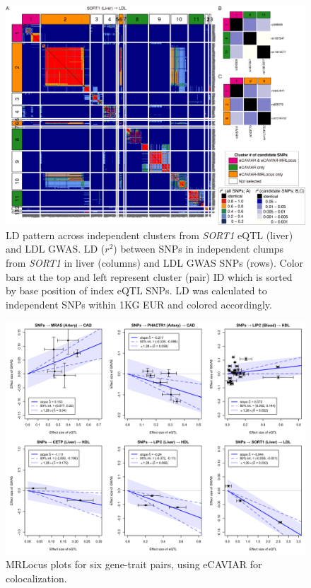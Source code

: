 \documentclass[11pt]{article}
\begin{document}
\begin{figure}[!ht]
  \centering
  \includegraphics[width=.7\textwidth]{figs/region/heatmap_eQTLbase.Liver_SORT1_LDL.20201217.png}
  \caption{LD pattern across independent clusters from \emph{SORT1}
    eQTL (liver) and LDL GWAS. LD ($r^2$) between SNPs in independent
    clumps from \emph{SORT1} in liver (columns) and LDL GWAS SNPs
    (rows). Color bars at the top and left represent cluster (pair) ID
    which is sorted by base position of index eQTL SNPs. LD was
    calculated to independent SNPs within 1KG EUR and colored
    accordingly.}
  \label{fig:ld5}
\end{figure}

\begin{figure}[!ht]
  \centering
  \includegraphics[width=\textwidth]{figs/real_loci_ecav-mrlocus.png}
  \caption{MRLocus plots for six gene-trait pairs, using eCAVIAR for colocalization.}
\end{figure}
\end{document}
